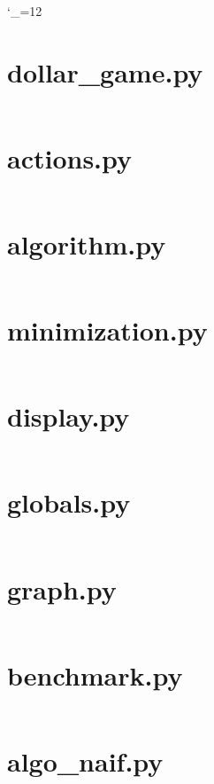 \documentclass{article}
\begin{document}

\catcode`_=12

\section*{dollar_game.py		}\inputminted[linenos, breaklines, breakautoindent]{python}{../dollar_game/dollar_game.pyde}\newpage    
\section*{actions.py			}\inputminted[linenos, breaklines, breakautoindent]{python}{../dollar_game/actions.py}\newpage        
\section*{algorithm.py			}\inputminted[linenos, breaklines, breakautoindent]{python}{../dollar_game/algorithm.py}\newpage      
\section*{minimization.py		}\inputminted[linenos, breaklines, breakautoindent]{python}{../dollar_game/minimization.py}\newpage
\section*{display.py			}\inputminted[linenos, breaklines, breakautoindent]{python}{../dollar_game/display.py}\newpage
\section*{globals.py			}\inputminted[linenos, breaklines, breakautoindent]{python}{../dollar_game/globals.py}\newpage
\section*{graph.py				}\inputminted[linenos, breaklines, breakautoindent]{python}{../dollar_game/graph.py}\newpage
\section*{benchmark.py			}\inputminted[linenos, breaklines, breakautoindent]{python}{../dollar_game/benchmark.py}\newpage
\section*{algo_naif.py			}\inputminted[linenos, breaklines, breakautoindent]{python}{../dollar_game/algo_naive.py}\newpage
\end{document}
